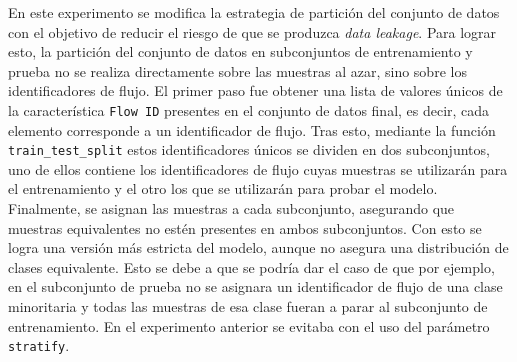 En este experimento se modifica la estrategia de partición del conjunto de datos con el objetivo de reducir el riesgo de que se produzca \textit{data leakage}. Para lograr esto, la partición del conjunto de datos en subconjuntos de entrenamiento y prueba no se realiza directamente sobre las muestras al azar, sino sobre los identificadores de flujo. El primer paso fue obtener una lista de valores únicos de la característica \texttt{Flow ID} presentes en el conjunto de datos final, es decir, cada elemento corresponde a un identificador de flujo. Tras esto, mediante la función \texttt{train\_test\_split} estos identificadores únicos se dividen en dos subconjuntos, uno de ellos contiene los identificadores de flujo cuyas muestras se utilizarán para el entrenamiento y el otro los que se utilizarán para probar el modelo. Finalmente, se asignan las muestras a cada subconjunto, asegurando que muestras equivalentes no estén presentes en ambos subconjuntos. Con esto se logra una versión más estricta del modelo, aunque no asegura una distribución de clases equivalente. Esto se debe a que se podría dar el caso de que por ejemplo, en el subconjunto de prueba no se asignara un identificador de flujo de una clase minoritaria y todas las muestras de esa clase fueran a parar al subconjunto de entrenamiento. En el experimento anterior se evitaba con el uso del parámetro \texttt{stratify}.

